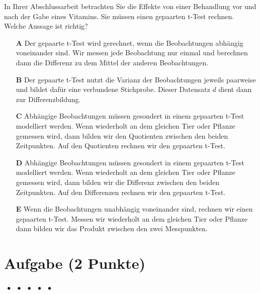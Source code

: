 \documentclass[a4paper, 9pt]{scrartcl}\usepackage[]{graphicx}\usepackage[]{xcolor}
\begin{document}
In Ihrer Abschlussarbeit betrachten Sie die Effekte von einer Behandlung vor und nach der Gabe eines Vitamins. Sie müssen einen gepaarten t-Test rechnen. Welche Aussage ist richtig?



\begin{enumerate}
\item [\textbf{A} \msquare] Der gepaarte t-Test wird gerechnet, wenn die Beobachtungen abhängig voneinander sind. Wir messen jede Beobachtung nur einmal und berechnen dann die Differenz zu dem Mittel der anderen Beobachtungen.
\item [\textbf{B} \msquare] Der gepaarte t-Test nutzt die Varianz der Beobachtungen jeweils paarweise und bildet dafür eine verbundene Stichprobe. Dieser Datensatz $d$ dient dann zur Differenzbildung.
\item [\textbf{C} \msquare] Abhängige Beobachtungen müssen gesondert in einem gepaarten t-Test modelliert werden. Wenn wiederholt an dem gleichen Tier oder Pflanze gemessen wird, dann bilden wir den Quotienten zwischen den beiden Zeitpunkten. Auf den Quotienten rechnen wir den gepaarten t-Test.
\item [\textbf{D} \msquare] Abhängige Beobachtungen müssen gesondert in einem gepaarten t-Test modelliert werden. Wenn wiederholt an dem gleichen Tier oder Pflanze gemessen wird, dann bilden wir die Differenz zwischen den beiden Zeitpunkten. Auf den Differenzen rechnen wir den gepaarten t-Test.
\item [\textbf{E} \msquare] Wenn die Beobachtungen unabhängig voneinander sind, rechnen wir einen gepaarten t-Test. Messen wir wiederholt an dem gleichen Tier oder Pflanze dann bilden wir das Produkt zwischen den zwei Messpunkten.
\end{enumerate}

\section{Aufgabe \hfill (2 Punkte)}

\ifcollection
\begin{flushright}
\tiny\vspace{-2Ex}
\textbf{\examinhaltstart}
\exammodulemathstat $\;\bullet$
\exammodulestat $\;\bullet$
\exammodulestat $\;\bullet$
\exammodulestatbbv $\;\bullet$
\exammodulestatversuch $\;\bullet$
\exammodulebiostat
\vspace{-1Ex}
\end{flushright}
\fi
\end{document}
